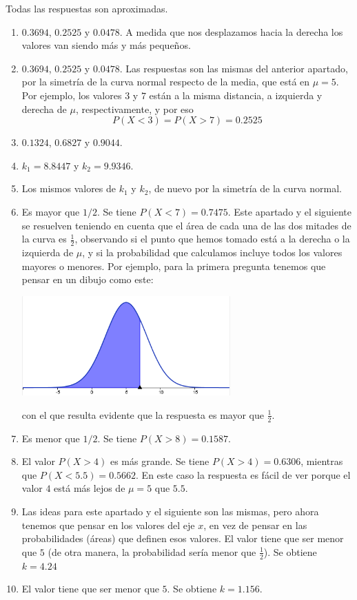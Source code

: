 \documentclass[10pt,a4paper]{article}\usepackage[]{graphicx}\usepackage[]{color}
\begin{document}
Todas las respuestas son aproximadas.
\begin{enumerate}
  \item $0.3694$, $0.2525$ y $0.0478$. A medida que nos desplazamos hacia la derecha los valores van siendo más y más pequeños.
  \item $0.3694$, $0.2525$ y $0.0478$. Las respuestas son las mismas del anterior apartado, por la simetría de la curva normal respecto de la media, que está en $\mu = 5$. Por ejemplo, los valores $3$ y $7$ están a la misma distancia, a izquierda y derecha de $\mu$, respectivamente, y por eso
      \[P(X < 3) = P(X > 7) = 0.2525\]
  \item $0.1324$, $0.6827$ y $0.9044$.
  \item $k_1 = 8.8447$ y $k_2 = 9.9346$.
  \item Los mismos valores de $k_1$ y $k_2$, de nuevo por la simetría de la curva normal.
  \item Es mayor que $1/2$. Se tiene $P(X < 7) = 0.7475$. Este apartado y el siguiente se resuelven teniendo en cuenta que el área de cada una de las dos mitades de la curva es $\frac{1}{2}$, observando si el punto que hemos tomado está a la derecha o la izquierda de $\mu$, y si la probabilidad que calculamos incluye todos los valores mayores o menores. Por ejemplo, para la primera pregunta tenemos que pensar en un dibujo como este:
      \begin{center}
        \includegraphics[width=8cm]{../fig/Tut05-62.png}
      \end{center}
      con el que resulta evidente que la respuesta es mayor que $\frac{1}{2}$.
  \item Es menor que $1/2$. Se tiene $P(X > 8) = 0.1587$.
  \item El valor $P(X > 4)$ es más grande. Se tiene $P(X > 4) = 0.6306$, mientras que $P(X < 5.5)=0.5662$. En este caso la respuesta es fácil de ver porque el valor $4$ está más lejos de $\mu = 5$ que $5.5$.
  \item Las ideas para este apartado y el siguiente son las mismas, pero ahora tenemos que pensar en los valores del eje $x$, en vez de pensar en las probabilidades (áreas) que definen esos valores. El valor tiene que ser menor que $5$ (de otra manera, la probabilidad sería menor que $\frac{1}{2}$). Se obtiene $k = 4.24$
  \item El valor tiene que ser menor que $5$. Se obtiene $k = 1.156$.
\end{enumerate}
\end{document}
